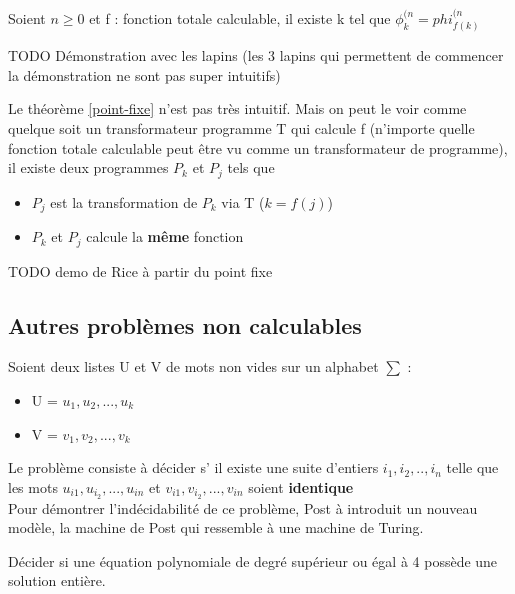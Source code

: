 \begin{mytheo} 
	\label{point-fixe}Soient $n \geq 0$ et f : fonction totale 
	calculable, il existe k tel que $\phi^{(n}_k = phi^{(n}_{f(k)}$  
\end{mytheo}

TODO Démonstration avec les lapins (les 3 lapins qui permettent
de commencer la démonstration ne sont pas super intuitifs)
\begin{myrem}
	Le théorème \ref{point-fixe} n'est pas très intuitif. Mais on peut le 
	voir comme quelque soit un transformateur programme T qui calcule f 
	(n'importe quelle fonction totale calculable peut être vu comme un transformateur 
	de programme), \\
	il existe deux programmes $P_k$ et $P_j$ tels que 
	\begin{itemize}
		\item $P_j$ est la transformation de $P_k$ via T ($k=f(j)$)
		\item $P_k$ et $P_j$ calcule la \textbf{même} fonction
	\end{itemize}
\end{myrem}

TODO demo de Rice à partir du point fixe

\subsection{Autres problèmes non calculables}
\label{sub:autres_probl_mes_non_calculable}

\begin{mydef} Soient deux listes U et V 
	de mots non vides sur un alphabet $\sum$ : 
	\begin{itemize}
		\item U = ${u_1,u_2,...,u_k}$
		\item V = ${v_1,v_2,...,v_k}$
	\end{itemize}
	Le problème consiste à décider s’ il existe une suite d'entiers 
	$i_1,i_2,..,i_n$ telle que les mots $u_{i1},u_{i_2},...,u_{in}$ et 
	$v_{i1},v_{i_2},...,v_{in}$ soient \textbf{identique} \\
	Pour démontrer l'indécidabilité de ce problème, Post à introduit un 
	nouveau modèle, la machine de Post qui ressemble à une machine de Turing.
\end{mydef}

\begin{mydef} Décider si une équation 
	polynomiale de degré supérieur ou égal à 4 possède une solution entière.
\end{mydef}

